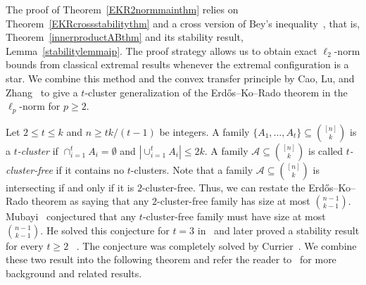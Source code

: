\documentclass[11pt]{article}
\numberwithin{equation}{section}
\def\A{\mathcal{A}}
\begin{document}
The proof of Theorem~\ref{EKR2normmainthm} relies on Theorem~\ref{EKRcrossstabilitythm}
and a cross version of Bey's inequality~\cite{Bey}, that is, Theorem~\ref{innerproductABthm} and its stability result, Lemma~\ref{stabilitylemmaip}.
The proof strategy allows us to obtain exact $\ell_2$-norm bounds from
classical extremal results whenever the extremal configuration is a star.
We combine this method and the convex transfer principle by Cao, Lu, and Zhang~\cite{Cao}
to give a $t$-cluster generalization of the Erd\H{o}s--Ko--Rado theorem in the $\ell_p$-norm for $p\geq2$.











Let $2\leq t\leq k$ and $n\geq tk/(t-1)$ be integers.
A family $\{A_1,\ldots, A_t\}\subseteq \binom{[n]}{k}$ is a {\em $t$-cluster} if
$ \cap_{i=1}^t A_i=\emptyset$ and $\left|\cup_{i=1}^t A_i\right|\leq 2k$.
A family $\mathcal{A} \subseteq \binom{[n]}{k}$ is called {\em $t$-cluster-free} if it contains no $t$-clusters.
Note that a family $\mathcal{A} \subseteq \binom{[n]}{k}$ is intersecting if and only if it is $2$-cluster-free.
Thus, we can restate the Erd\H{o}s--Ko--Rado theorem as saying that any $2$-cluster-free family has size at most $\binom{n-1}{k-1}$.
Mubayi~\cite{Mubayi2006} conjectured that any $t$-cluster-free family must have size at most $\binom{n-1}{k-1}$.
He solved this conjecture for $t=3$ in~\cite{Mubayi2006} and later proved  a stability result for every $t\geq 2$ ~\cite[Theorem 2]{Mubayi2007}.
The conjecture was completely solved by Currier~\cite[Theorem 2]{Currier}.
We combine these two result into the following theorem and refer the reader to~\cite{Currier,Mubayi2006,Mubayi2007} for more background and related results.
\end{document}
